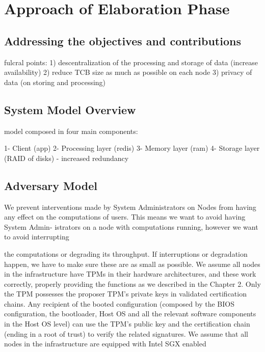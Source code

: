 \chapter{Approach of Elaboration Phase}
\label{cha:approach_of_elaboration_phase}


\section{Addressing the objectives and contributions} %
\label{sec:document_structure}


fulcral points: 1) descentralization of the processing and storage of data (increase availability)
2) reduce TCB size as much as possible on each node
3) privacy of data (on storing and processing)


\section{System Model Overview} %
\label{sec:dealing_with_bibliogrpahy}

model composed in four main components:

1- Client (app)
2- Processing layer (redis)
3- Memory layer (ram)
4- Storage layer (RAID of disks) - increased redundancy


\section{Adversary Model} %
\label{sec:inserting_tables}

We prevent interventions made by System Administrators on Nodes from having any
effect on the computations of users. This means we want to avoid having System Admin-
istrators on a node with computations running, however we want to avoid interrupting

the computations or degrading its throughput. If interruptions or degradation happen,
we have to make sure these are as small as possible.
We assume all nodes in the infrastructure have TPMs in their hardware architectures,
and these work correctly, properly providing the functions as we described in the Chapter
2. Only the TPM possesses the proposer TPM’s private keys in validated certification
chains. Any recipient of the booted configuration (composed by the BIOS configuration,
the bootloader, Host OS and all the relevant software components in the Host OS level)
can use the TPM’s public key and the certification chain (ending in a root of trust) to
verify the related signatures.
We assume that all nodes in the infrastructure are equipped with Intel SGX enabled

